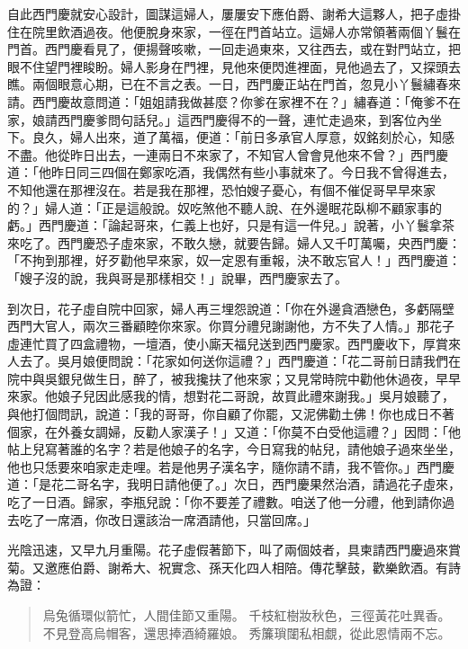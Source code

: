 自此西門慶就安心設計，圖謀這婦人，屢屢安下應伯爵、謝希大這夥人，把子虛掛住在院里飲酒過夜。他便脫身來家，一徑在門首站立。這婦人亦常領著兩個丫鬟在門首。西門慶看見了，便揚聲咳嗽，一回走過東來，又往西去，或在對門站立，把眼不住望門裡睃盼。婦人影身在門裡，見他來便閃進裡面，見他過去了，又探頭去瞧。兩個眼意心期，已在不言之表。一日，西門慶正站在門首，忽見小丫鬟繡春來請。西門慶故意問道：「姐姐請我做甚麼？你爹在家裡不在？」繡春道：「俺爹不在家，娘請西門慶爹問句話兒。」這西門慶得不的一聲，連忙走過來，到客位內坐下。良久，婦人出來，道了萬福，便道：「前日多承官人厚意，奴銘刻於心，知感不盡。他從昨日出去，一連兩日不來家了，不知官人曾會見他來不曾？」西門慶道：「他昨日同三四個在鄭家吃酒，我偶然有些小事就來了。今日我不曾得進去，不知他還在那裡沒在。若是我在那裡，恐怕嫂子憂心，有個不催促哥早早來家的？」婦人道：「正是這般說。奴吃煞他不聽人說、在外邊眠花臥柳不顧家事的虧。」西門慶道：「論起哥來，仁義上也好，只是有這一件兒。」說著，小丫鬟拿茶來吃了。西門慶恐子虛來家，不敢久戀，就要告歸。婦人又千叮萬囑，央西門慶：「不拘到那裡，好歹勸他早來家，奴一定恩有重報，決不敢忘官人！」西門慶道：「嫂子沒的說，我與哥是那樣相交！」說畢，西門慶家去了。

到次日，花子虛自院中回家，婦人再三埋怨說道：「你在外邊貪酒戀色，多虧隔壁西門大官人，兩次三番顧睦你來家。你買分禮兒謝謝他，方不失了人情。」那花子虛連忙買了四盒禮物，一壇酒，使小廝天福兒送到西門慶家。西門慶收下，厚賞來人去了。吳月娘便問說：「花家如何送你這禮？」西門慶道：「花二哥前日請我們在院中與吳銀兒做生日，醉了，被我攙扶了他來家；又見常時院中勸他休過夜，早早來家。他娘子兒因此感我的情，想對花二哥說，故買此禮來謝我。」吳月娘聽了，與他打個問訊，說道：「我的哥哥，你自顧了你罷，又泥佛勸土佛！你也成日不著個家，在外養女調婦，反勸人家漢子！」又道：「你莫不白受他這禮？」因問：「他帖上兒寫著誰的名字？若是他娘子的名字，今日寫我的帖兒，請他娘子過來坐坐，他也只恁要來咱家走走哩。若是他男子漢名字，隨你請不請，我不管你。」西門慶道：「是花二哥名字，我明日請他便了。」次日，西門慶果然治酒，請過花子虛來，吃了一日酒。歸家，李瓶兒說：「你不要差了禮數。咱送了他一分禮，他到請你過去吃了一席酒，你改日還該治一席酒請他，只當回席。」

光陰迅速，又早九月重陽。花子虛假著節下，叫了兩個妓者，具柬請西門慶過來賞菊。又邀應伯爵、謝希大、祝實念、孫天化四人相陪。傳花擊鼓，歡樂飲酒。有詩為證：
\begin{quote}
烏兔循環似箭忙，人間佳節又重陽。
千枝紅樹妝秋色，三徑黃花吐異香。
不見登高烏帽客，還思捧酒綺羅娘。
秀簾瑣闥私相覷，從此恩情兩不忘。
\end{quote}

